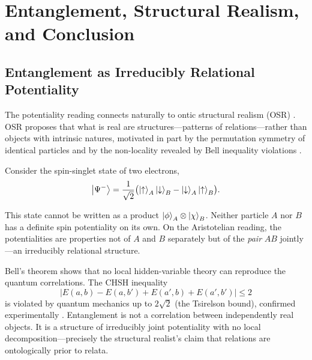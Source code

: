 \section{Entanglement, Structural Realism, and Conclusion}
\label{section:structural}

\subsection{Entanglement as Irreducibly Relational Potentiality}

The potentiality reading connects naturally to ontic structural realism (OSR) \citep{ladyman_2007_everything, french_2014_structure}. OSR proposes that what is real
are structures---patterns of relations---rather than objects with intrinsic natures, motivated in part by the permutation symmetry of
identical particles \citep{french_1988_indiscernibles} and by the non-locality revealed by Bell inequality violations \cite{bell_1964_epr, aspect_1982_bell, hensen_2015_loophole}.

\medskip

Consider the spin-singlet state of two electrons,
\begin{equation}
  \left|\Psi^-\right\rangle = \frac{1}{\sqrt{2}}\bigl(\left|\uparrow\right\rangle_A\left|\downarrow\right\rangle_B - \left|\downarrow\right\rangle_A\left|\uparrow\right\rangle_B\bigr).
  \label{eq:bell}
\end{equation}

This state cannot be written as a product $\left|\phi\right\rangle_A\otimes\left|\chi\right\rangle_B$. Neither particle $A$ nor $B$ has a definite spin potentiality on its own. On the Aristotelian reading, the potentialities are properties not of $A$ and $B$ separately but of the \textit{pair} $AB$ jointly---an irreducibly relational structure.

\medskip

Bell's theorem \citep{bell_1964_epr} shows that no local hidden-variable theory can reproduce the quantum correlations. The CHSH inequality
\begin{equation}
  \bigl|E(a,b) - E(a,b') + E(a',b) + E(a',b')\bigr| \leq 2
  \label{eq:chsh}
\end{equation}
is violated by quantum mechanics up to $2\sqrt{2}$ (the Tsirelson bound), confirmed experimentally \citep{aspect_1982_bell, hensen_2015_loophole}. Entanglement is not a correlation between independently real objects. It is a structure of irreducibly joint potentiality with no local decomposition---precisely the structural realist's claim that relations are ontologically prior to relata.

